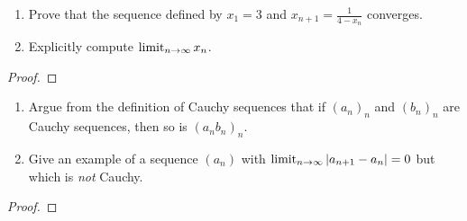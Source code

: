 \documentclass[11pt,twoside,openany]{memoir}
\begin{document}
\newpage
\fancyhead[L]{\scalebox{0.9}{Sequences}}
\fancyhead[R]{\scalebox{0.9}{Appeared on: F16}}
\begin{problem}
    \phantom{a}
    \begin{enumerate}[label = (\arabic*)]
        \item Prove that the sequence defined by $x_1 = 3$ and $x_{n+1} = \frac{1}{4 - x_n}$ converges.
        \item Explicitly compute $\operatorname*{limit}_{n \rightarrow \infty} x_n$.
    \end{enumerate}
\end{problem}
\begin{proof}
\end{proof}

\newpage
\fancyhead[L]{\scalebox{0.9}{Sequences}}
\fancyhead[R]{\scalebox{0.9}{Appeared on: S16}}
\begin{problem}
    \phantom{a}
    \begin{enumerate}[label = (\arabic*)]
        \item Argue from the definition of Cauchy sequences that if $(a_n)_n$ and $(b_n)_n$ are Cauchy sequences, then so is $(a_n b_n)_n$.
        \item Give an example of a sequence $(a_n)$ with $\operatorname*{limit}_{n \rightarrow \infty} |a_{n+1} - a_n| = 0$ but which is \textit{not} Cauchy.
    \end{enumerate}
\end{problem}
\begin{proof}
\end{proof}
\end{document}
